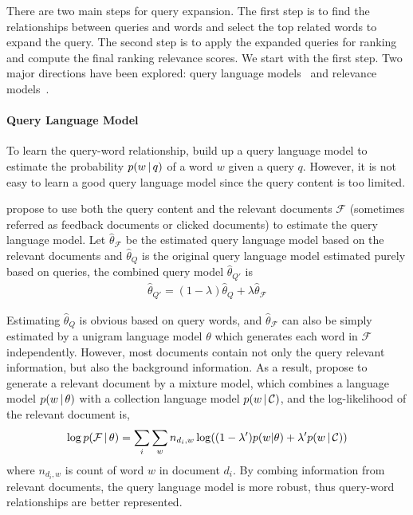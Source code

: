 There are two main steps for query expansion. The first step is to
find the relationships between queries and words and select the top
related words to expand the query. The second step is to apply the
expanded queries for ranking and compute the final ranking relevance
scores. We start with the first step. Two major directions have been
explored: query language models~\citep{zhai-01b} and relevance
models~\citep{Lavrenko-2001}.

\paragraph{Query Language Model}

To learn the query-word relationship, \citet{zhai-01b} build up a query
language model to estimate the probability $p(w \, | \, q)$ of a word $w$
given a query $q$. However, it is not easy to learn a good query
language model since the query content is too limited.

\citet{zhai-01b} propose to use both the query content and the relevant
documents $\mathcal{F}$ (sometimes referred as feedback documents or clicked
documents) to estimate the query language model. Let
$\hat{\theta}_{\mathcal{F}}$ be the estimated query language model
based on the relevant documents and $\hat{\theta}_{Q}$ is the original query language model estimated purely based on queries,
the combined query model $\hat{\theta}_{Q'}$ is
\begin{align}
\label{eq:qlm-comb}
\hat{\theta}_{Q'} = (1 - \lambda)\hat{\theta}_{Q} + \lambda \hat{\theta}_{\mathcal{F}}
\end{align}

Estimating $\hat{\theta}_{Q}$ is obvious based on query words, and $\hat{\theta}_{\mathcal{F}}$ can
also be simply estimated by a unigram language model $\theta$
which generates each word in $\mathcal{F}$ independently. However,
most documents contain not only the query relevant information, but
also the background information. As a result, \citet{zhai-01b} propose
to generate a relevant document by a mixture model, which combines a
language model $p(w \, | \, \theta)$ with a collection language model
$p(w \, | \, \mathcal{C})$, and the log-likelihood of the relevant document
is,
\begin{align}
\log p(\mathcal{F} \, | \, \theta) = \sum_i \sum_w n_{d_i, w}
  \log((1-\lambda')p(w|\theta) + \lambda' p(w \, | \, \mathcal{C}))
\end{align}
where $n_{d_i, w}$ is count of word $w$ in document $d_i$.  By combing
information from relevant documents, the query language model is
more robust, thus query-word relationships are better represented.

